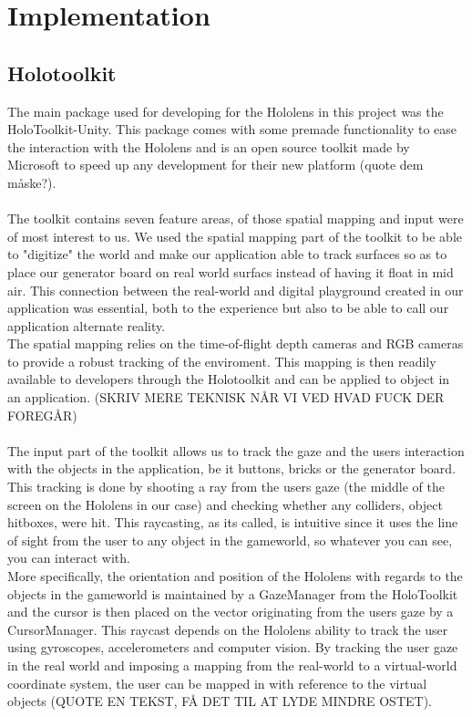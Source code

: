 \section{Implementation}

\subsection{Holotoolkit}
The main package used for developing for the Hololens in this project was the HoloToolkit-Unity. This package comes with some premade functionality to ease the interaction with the Hololens and is an open source toolkit made by Microsoft to speed up any development for their new platform (quote dem måske?).\\
\\
The toolkit contains seven feature areas, of those spatial mapping and input were of most interest to us. We used the spatial mapping part of the toolkit to be able to "digitize" the world and make our application able to track surfaces so as to place our generator board on real world surfacs instead of having it float in mid air. This connection between the real-world and digital playground created in our application was essential, both to the experience but also to be able to call our application alternate reality.\\
The spatial mapping relies on the time-of-flight depth cameras and RGB cameras to provide a robust tracking of the enviroment. This mapping is then readily available to developers through the Holotoolkit and can be applied to object in an application.
(SKRIV MERE TEKNISK NÅR VI VED HVAD FUCK DER FOREGÅR) 
\\\\
The input part of the toolkit allows us to track the gaze and the users interaction with the objects in the application, be it buttons, bricks or the generator board. This tracking is done by shooting a ray from the users gaze (the middle of the screen on the Hololens in our case) and checking whether any colliders, object hitboxes, were hit. This raycasting, as its called, is intuitive since it uses the line of sight from the user to any object in the gameworld, so whatever you can see, you can interact with.\\
More specifically, the orientation and position of the Hololens with regards to the objects in the gameworld is maintained by a GazeManager from the HoloToolkit and the cursor is then placed on the vector originating from the users gaze by a CursorManager. This raycast depends on the Hololens ability to track the user using gyroscopes, accelerometers and computer vision. By tracking the user gaze in the real world and imposing a mapping from the real-world to a virtual-world coordinate system, the user can be mapped in with reference to the virtual objects (QUOTE EN TEKST, FÅ DET TIL AT LYDE MINDRE OSTET). 